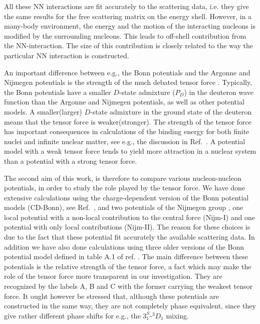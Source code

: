 All these NN interactions are fit accurately to the scattering data, 
i.e. they give the same results for the free scattering matrix  
on the energy shell. 
However, in a many-body environment, the energy and the motion 
of the interacting  nucleons is modified by the surrounding nucleons.
This leads to off-shell contribution from the NN-interaction. The size of
this contribution is closely related to the way the particular  NN interaction
is constructed. 

An important difference between e.g., the Bonn potentials
and the Argonne and Nijmegen potentials is the strength of the 
much debated tensor force \cite{bm95}. 
Typically, the Bonn potentials have 
a smaller $D$-state admixture ($P_D$)  in the deuteron wave function
than the Argonne and Nijmegen potentials, as well as
other potential models. A smaller(larger) $D$-state
admixture in the ground state of the deuteron 
means that the tensor force is weaker(stronger).
The strength of the tensor force has important consequences 
in calculations of the binding energy for both
finite nuclei and infinite nuclear matter, see e.g., the discussion
in Ref.\ \cite{hko95}. A potential model  with a weak tensor force
tends to yield more attraction in a nuclear system than a 
potential with a strong tensor force.

The second  aim of this work, is therefore to compare various
nucleon-nucleon potentials, in order to study 
the role played by the tensor force. We have done extensive 
calculations using
the charge-dependent version of the Bonn potential models (CD-Bonn), 
see Ref.\ \cite{cdbonn}, 
and two potentials of the Nijmegen group \cite{nim}, one 
local potential with a non-local contribution to the central force 
(Nijm-I) and one potential with only local contributions (Nijm-II).
The reason for these choices is due to the fact that these
potential fit accurately the available  scattering data.
In addition we have also 
done calculations using three older versions of the Bonn 
potential model defined in  table A.1 of ref. \cite{mac89}. 
The main difference between these potentials is the 
relative strength of the tensor force, 
a fact which may make the role of the 
tensor force more transparent in our investigation.
They are recognized by the labels  A, B and C with the former carrying 
the weakest tensor force. 
It ought however be stressed that, although these potentials are constructed
in the same way, they are not completely phase equivalent, since 
they give rather different phase shifts for e.g., the $3^S_1$-$^3D_1$
mixing.  



